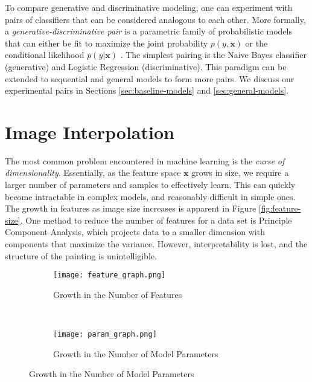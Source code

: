 \documentclass{article}
\begin{document}
To compare generative and discriminative modeling, one can experiment
with pairs of classifiers that can be considered analogous to each other.
More formally, a \textit{generative-discriminative pair} is a parametric
family of probabilistic models that can either be fit to maximize the joint
probability $p(y, \mathbf{x})$ or the conditional
likelihood $p(y | \mathbf{x})$ \cite{NgJordan}. The simplest pairing is
the Naive Bayes classifier (generative) and Logistic Regression
(discriminative). This paradigm can be extended to sequential and general
models to form more pairs. We discuss our experimental pairs
in Sections \ref{sec:baseline-models} and \ref{sec:general-models}.




\section{Image Interpolation}
\label{sec:img-interpolation}
The most common problem encountered in machine learning is the
\textit{curse of dimensionality}. Essentially, as the feature space
$\mathbf{x}$ grows in size, we require a larger number of parameters and samples
to effectively learn. This can quickly become intractable in complex models, and
reasonably difficult in simple ones. The growth
in features as image size increases is apparent in Figure \ref{fig:feature-size}.
One method to reduce the number of
features for a data set is Principle Component Analysis, which projects
data to a smaller dimension with components that maximize the variance. However,
interpretability is lost, and the structure of the painting is unintelligible.

\begin{figure}[h!]
  \centering
  \caption{As the image size increases, the problem quickly becomes intractable}
  \label{fig:feature-size}
  \begin{subfigure}[b]{0.45\textwidth}
    \centering
    \texttt{[image: feature\_graph.png]}
    \caption{Growth in the Number of Features}
    \label{fig:feature-graph}
  \end{subfigure}
  ~
  \begin{subfigure}[b]{0.45\textwidth}
    \centering
    \texttt{[image: param\_graph.png]}
    \caption{Growth in the Number of Model Parameters}
    \label{fig:param-graph}
  \end{subfigure}
\end{figure}
\end{document}
